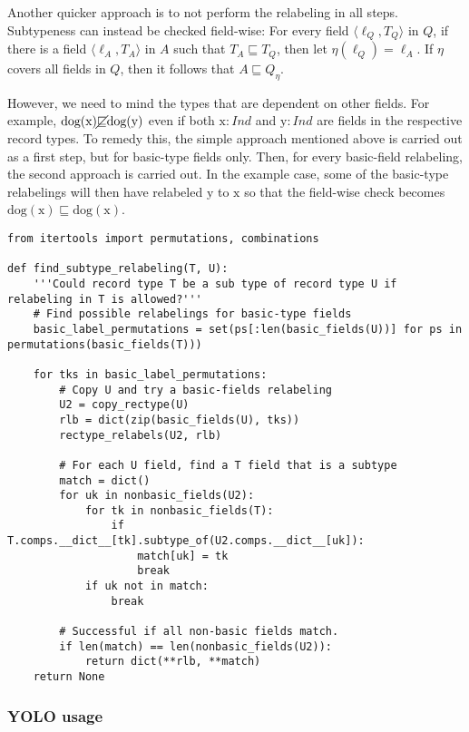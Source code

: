 Another quicker approach is to not perform the relabeling in all steps.
Subtypeness can instead be checked field-wise:
For every field $\langle\ell_Q, T_Q\rangle$ in $Q$, if there is a field $\langle\ell_A, T_A\rangle$ in $A$ such that $T_A \sqsubseteq T_Q$, then let $\eta(\ell_Q) = \ell_A$.
If $\eta$ covers all fields in $Q$, then it follows that $A \sqsubseteq Q_\eta$.

However, we need to mind the types that are dependent on other fields.
For example, $\text{dog}(\text{x}) \cancel{\sqsubseteq} \text{dog}(\text{y})$ even if both $\text{x}:Ind$ and $\text{y}:Ind$ are fields in the respective record types.
To remedy this, the simple approach mentioned above is carried out as a first step, but for basic-type fields only.
Then, for every basic-field relabeling, the second approach is carried out.
In the example case, some of the basic-type relabelings will then have relabeled $\text{y}$ to $\text{x}$ so that the field-wise check becomes $\text{dog}(\text{x}) \sqsubseteq \text{dog}(\text{x})$.

\begin{lstlisting}[label=lst:subtyperlb, caption=Implementation of the relabel-subtype relation.]
from itertools import permutations, combinations

def find_subtype_relabeling(T, U):
    '''Could record type T be a sub type of record type U if relabeling in T is allowed?'''
    # Find possible relabelings for basic-type fields
    basic_label_permutations = set(ps[:len(basic_fields(U))] for ps in permutations(basic_fields(T)))
    
    for tks in basic_label_permutations:
        # Copy U and try a basic-fields relabeling
        U2 = copy_rectype(U)
        rlb = dict(zip(basic_fields(U), tks))
        rectype_relabels(U2, rlb)
        
        # For each U field, find a T field that is a subtype
        match = dict()
        for uk in nonbasic_fields(U2):
            for tk in nonbasic_fields(T):
                if T.comps.__dict__[tk].subtype_of(U2.comps.__dict__[uk]):
                    match[uk] = tk
                    break
            if uk not in match:
                break

        # Successful if all non-basic fields match.
        if len(match) == len(nonbasic_fields(U2)):
            return dict(**rlb, **match)
    return None
\end{lstlisting}



\subsubsection{YOLO usage}

